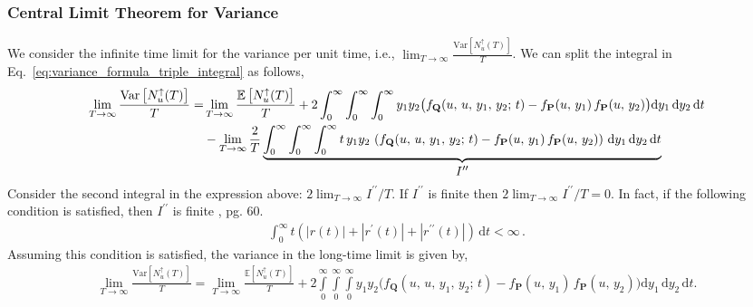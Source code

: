 \documentclass[journal]{IEEEtran}
\theoremstyle{plain}
\theoremstyle{definition}
\theoremstyle{remark}
\newcommand{\E}{\mathbb{E}}
\newcommand{\Nup}{N_u^{\uparrow}(T)}
\newcommand{\dd}{\mathrm{d}}
\newcommand{\Var}{\text{Var}}
\newcommand{\rp}{r^\prime}
\newcommand{\rpp}{r^{\prime\prime}}
\begin{document}
\subsubsection{Central Limit Theorem for Variance}
We consider the infinite time limit for the variance per unit time, i.e., $\lim_{T \rightarrow \infty}\frac{\Var[\Nup]}{T}$. We can split the integral in Eq.~\eqref{eq:variance_formula_triple_integral} as follows,
\begin{equation}
\begin{split}
    \lim_{T \rightarrow \infty}\frac{\Var\left[\Nup\right]}{T} =& \lim_{T\rightarrow\infty} \frac{\E\left[\Nup\right]}{T} + 2 \int_{0}^\infty \int_{0}^\infty \int_{0}^\infty y_1 y_2 \bigl( f_{\mathbf{Q}}(u, \,u, \,y_1, \,y_2; \, t)  - f_{\mathbf{P}}(u,\,y_1) \, f_{\mathbf{P}}(u,\,y_2)\bigr)\dd y_1 \, \dd y_2 \, \dd t \\
    &- \lim_{T\rightarrow\infty}\frac{2}{T} \underbrace{\int_{0}^\infty \int_{0}^\infty \int_{0}^\infty t\, y_1 y_2 \,\left( f_{\mathbf{Q}}(u, \,u, \,y_1, \,y_2; \, t) - f_{\mathbf{P}}(u,\,y_1) \, f_{\mathbf{P}}(u,\,y_2)\right)\, \dd y_1 \, \dd y_2 \, \dd t}_{\text{\normalsize \(I^{\prime\prime}\)}}
\end{split}
\raisetag{30pt}
\end{equation}
Consider the second integral in the expression above: $2 \lim_{T\rightarrow\infty} I^{\prime\prime} / T$. If $I^{\prime\prime}$ is finite then $2 \lim_{T\rightarrow\infty} I^{\prime\prime} / T = 0$. In fact, if the following condition is satisfied, then $I^{\prime\prime}$ is finite \cite{piterbarg1996asymptotic}, pg. 60.
\begin{equation}
\begin{split}
    \int_0^\infty t \left(\left|r(t)\right| + \left|\rp(t)\right|+ \left|\rpp(t)\right|\right) \, \dd t < \infty\,.
\end{split} \label{eq:pieterbarg_condition}
\end{equation}
Assuming this condition is satisfied, the variance in the long-time limit is given by,
\begin{equation}
\begin{aligned}
    \lim_{T \rightarrow \infty}\frac{\Var\left[\Nup\right]}{T} = \lim_{T \rightarrow \infty}\frac{\E\left[\Nup\right]}{T} + 2 \int\limits_{0}^\infty \int\limits_{0}^\infty \int\limits_{0}^\infty y_1 y_2 \bigl( f_{\mathbf{Q}}(u, \,u, \,y_1, \,y_2; \, t) - f_{\mathbf{P}}(u,\,y_1) \, f_{\mathbf{P}}(u,\,y_2)\bigr) \dd y_1 \, \dd y_2 \, \dd t.
\end{aligned} \label{eq:variance_formula_triple_integral_CLT}
\end{equation}
\end{document}
